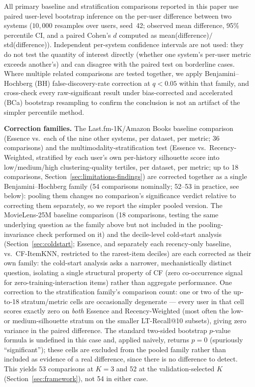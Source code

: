 \documentclass[11pt,a4paper]{article}
\begin{document}
All primary baseline and stratification comparisons reported in this
paper use paired user-level bootstrap inference on the per-user difference between two systems
($10{,}000$ resamples over users, seed~42; observed mean difference, 95\%
percentile CI, and a paired Cohen's $d$ computed as
mean(difference)$/$std(difference)). Independent per-system confidence
intervals are not used: they do not test the quantity of interest
directly (whether one system's per-user metric exceeds another's) and can
disagree with the paired test on borderline cases. Where multiple related comparisons are tested together,
we apply Benjamini--Hochberg (BH) false-discovery-rate correction at
$q<0.05$ within that family, and cross-check every raw-significant result
under bias-corrected and accelerated (BCa) bootstrap resampling to confirm
the conclusion is not an artifact of the simpler percentile method.

\textbf{Correction families.} The Last.fm-1K/Amazon Books baseline
comparison (Essence vs.\ each of the nine other systems, per dataset, per
metric; 36 comparisons) and the multimodality-stratification test
(Essence vs.\ Recency-Weighted, stratified by each user's own per-history
silhouette score into low/medium/high clustering-quality tertiles, per
dataset, per metric; up to 18 comparisons, Section~\ref{sec:limitations-findings})
are corrected together as a single Benjamini--Hochberg family (54
comparisons nominally; 52--53 in practice, see below): pooling them
changes no comparison's significance verdict relative to correcting them
separately, so we report the simpler pooled version. The MovieLens-25M
baseline comparison (18 comparisons, testing the same underlying
question as the family above but not included in the pooling-invariance
check performed on it) and the decile-level cold-start analysis (Section~\ref{sec:coldstart};
Essence, and separately each recency-only baseline, vs.\ CF-ItemKNN,
restricted to the rarest-item deciles) are each corrected as their own
family: the cold-start analysis asks a narrower, mechanistically distinct
question, isolating a single structural property of CF (zero
co-occurrence signal for zero-training-interaction items) rather than
aggregate performance. One correction to the stratification family's
comparison count: one or two of the up-to-18 stratum/metric cells are
occasionally degenerate --- every user in that cell scores exactly zero on
\emph{both} Essence and Recency-Weighted (most often the low- or
medium-silhouette stratum on the smaller LT-Recall@10 subsets), giving
zero variance in the paired difference. The standard two-sided bootstrap
$p$-value formula is undefined in this case and, applied naively, returns
$p=0$ (spuriously ``significant''); these cells are excluded from the
pooled family rather than included as evidence of a real difference,
since there is no difference to detect. This yields 53 comparisons at
$K=3$ and 52 at the validation-selected $K$ (Section~\ref{sec:framework}),
not 54 in either case.
\end{document}
